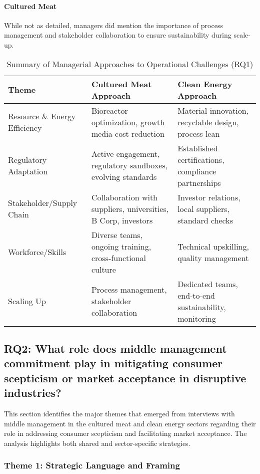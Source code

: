\paragraph{Cultured Meat}
While not as detailed, managers did mention the importance of process management and stakeholder collaboration to ensure sustainability during scale-up.

\begin{table}[h!]
	\centering
	\caption{Summary of Managerial Approaches to Operational Challenges (RQ1)}
	\label{tab:rq1_summary}
	\begin{tabularx}{\textwidth}{@{}lXX@{}}
		\toprule
		\textbf{Theme} & \textbf{Cultured Meat Approach} & \textbf{Clean Energy Approach} \\
		\midrule
		Resource \& Energy Efficiency & Bioreactor optimization, growth media cost reduction & Material innovation, recyclable design, process lean \\
		\addlinespace
		Regulatory Adaptation & Active engagement, regulatory sandboxes, evolving standards & Established certifications, compliance partnerships \\
		\addlinespace
		Stakeholder/Supply Chain & Collaboration with suppliers, universities, B Corp, investors & Investor relations, local suppliers, standard checks \\
		\addlinespace
		Workforce/Skills & Diverse teams, ongoing training, cross-functional culture & Technical upskilling, quality management \\
		\addlinespace
		Scaling Up & Process management, stakeholder collaboration & Dedicated teams, end-to-end sustainability, monitoring \\
		\bottomrule
	\end{tabularx}
\end{table}

\subsection*{RQ2: What role does middle management commitment play in mitigating consumer scepticism or market acceptance in disruptive industries?}
This section identifies the major themes that emerged from interviews with middle management in the cultured meat and clean energy sectors regarding their role in addressing consumer scepticism and facilitating market acceptance. The analysis highlights both shared and sector-specific strategies.

\subsubsection*{Theme 1: Strategic Language and Framing}
